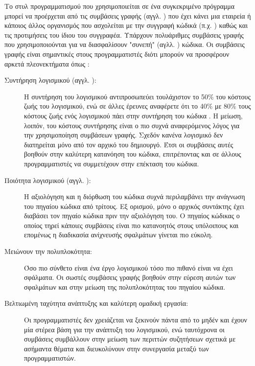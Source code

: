 \documentclass{assignment}
\begin{document}
Το στυλ προγραμματισμού που χρησιμοποιείται σε ένα συγκεκριμένο πρόγραμμα μπορεί να προέρχεται από τις συμβάσεις γραφής (αγγλ. ) που έχει κάνει μια εταιρεία ή κάποιος άλλος οργανισμός που ασχολείται με την συγγραφή κώδικά (π.χ. \cite{gnu_coding,site:gnu_style,site:google_cpp,
site:google_style,site:gnu_conventions,site:boost_guidelines,site:linux_style}) καθώς και τις προτιμήσεις του ίδιου του συγγραφέα. Υπάρχουν πολυάριθμες συμβάσεις γραφής που χρησιμοποιούνται για να διασφαλίσουν "συνεπή" (αγλλ. ) κώδικα. Οι συμβάσεις γραφής είναι σημαντικές στους προγραμματιστές διότι μπορούν να προσφέρουν αρκετά πλεονεκτήματα όπως \cite{wikibook:cpp_style,wiki:coding_convetions,sutter2004c++}:

\begin{description}
\item [Συντήρηση λογισμικού (αγγλ. ): ] Η  συντήρηση του λογισμικού αντιπροσωπεύει τουλάχιστον το 50\% του κόστους ζωής του λογισμικού\cite{Mohan}, ενώ σε άλλες έρευνες αναφέρετε ότι το 40\% με 80\% τους κόστους ζωής ενός λογισμικού πάει στην συντήρηση του κώδικα \cite{robert2003facts,wiki:coding_convetions}. Η μείωση, λοιπόν, του κόστους συντήρησης είναι ο πιο συχνά αναφερόμενος λόγος για την χρησιμοποίηση συμβάσεων γραφής. Σχεδόν κανένα λογισμικό δεν διατηρείται μόνο από τον αρχικό του δημιουργό. Έτσι οι συμβάσεις αυτές βοηθούν στην καλύτερη κατανόηση του κώδικα, επιτρέποντας και σε άλλους προγραμματιστές να συμμετέχουν στην επέκταση του κώδικα.
\item [Ποιότητα λογισμικού (αγγλ. ): ] Η αξιολόγηση και η διόρθωση του κώδικα συχνά περιλαμβάνει την ανάγνωση του πηγαίου κώδικα από τρίτους. Εξ ορισμού, μόνο ο αρχικός συντάκτης έχει διαβάσει τον πηγαίο κώδικα πριν την αξιολόγηση του. Ο πηγαίος κώδικας ο οποίος τηρεί κάποιες συμβάσεις είναι πιο κατανοητός στους υπόλοιπους και επομένως η διαδικασία ανίχνευσής σφαλμάτων γίνεται πιο εύκολη. %
\item [Μειώνουν την πολυπλοκότητα: ] Όσο πιο σύνθετο είναι ένα έργο λογισμικού τόσο πιο πιθανό είναι να έχει σφάλματα. Οι σωστές συμβάσεις γραφής βοηθούν στην εύρεση αυτών των σφαλμάτων και στην μείωση της πολυπλοκότητας του πηγαίου κώδικα. %
\item [ Βελτιωμένη ταχύτητα ανάπτυξης και καλύτερη ομαδική εργασία: ] Οι προγραμματιστές δεν χρειάζεται να ξεκινούν πάντα από το μηδέν και έχουν μία στέρεα βάση για την ανάπτυξη του λογισμικού, ενώ ταυτόχρονα οι συμβάσεις συμβάλλουν στην μείωση των περιττών συζητήσεων σχετικά με ασήμαντα θέματα και διευκολύνουν στην συνεργασία μεταξύ των προγραμματιστών.
\end{description}
\end{document}
